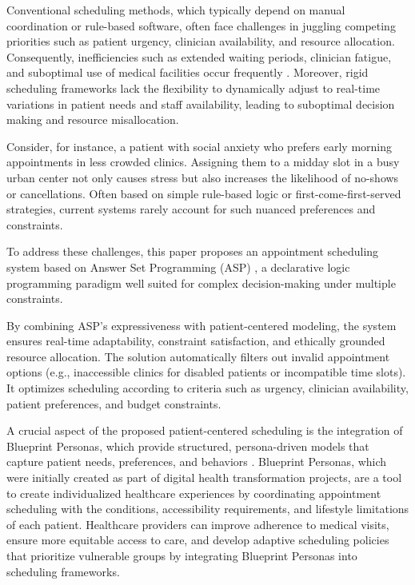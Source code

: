 \documentclass{tlp}
\begin{document}
Conventional scheduling methods, which typically depend on manual coordination or rule-based software, often face challenges in juggling competing priorities such as patient urgency, clinician availability, and resource allocation. Consequently, inefficiencies such as extended waiting periods, clinician fatigue, and suboptimal use of medical facilities occur frequently \citep{alrefaei2015modelling}. Moreover, rigid scheduling frameworks lack the flexibility to dynamically adjust to real-time variations in patient needs and staff availability, leading to suboptimal decision making and resource misallocation.

Consider, for instance, a patient with social anxiety who prefers early morning appointments in less crowded clinics. Assigning them to a midday slot in a busy urban center not only causes stress but also increases the likelihood of no-shows or cancellations. Often based on simple rule-based logic or first-come-first-served strategies, current systems rarely account for such nuanced preferences and constraints.

To address these challenges, this paper proposes an appointment scheduling system based on Answer Set Programming (ASP) \citep{baral2003knowledge,lifschitz2008handbook,costantini2010answer,lifschitz2019answer}, a declarative logic programming paradigm well suited for complex decision-making under multiple constraints.

By combining ASP’s expressiveness with patient-centered modeling, the system ensures real-time adaptability, constraint satisfaction, and ethically grounded resource allocation. The solution automatically filters out invalid appointment options (e.g., inaccessible clinics for disabled patients or incompatible time slots). It optimizes scheduling according to criteria such as urgency, clinician availability, patient preferences, and budget constraints.

A crucial aspect of the proposed patient-centered scheduling is the integration of Blueprint Personas, which provide structured, persona-driven models that capture patient needs, preferences, and behaviors \citep{monaldini2024blueprint}. Blueprint Personas, which were initially created as part of digital health transformation projects, are a tool to create individualized healthcare experiences by coordinating appointment scheduling with the conditions, accessibility requirements, and lifestyle limitations of each patient. Healthcare providers can improve adherence to medical visits, ensure more equitable access to care, and develop adaptive scheduling policies that prioritize vulnerable groups by integrating Blueprint Personas into scheduling frameworks. 
\end{document}
